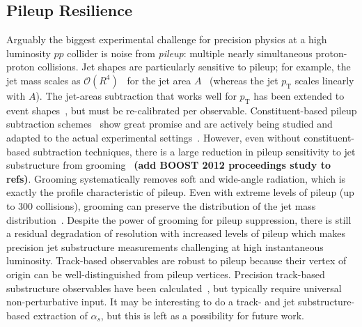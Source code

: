 \subsection{Pileup Resilience}

Arguably the biggest experimental challenge for precision physics at a high luminosity $pp$ collider is noise from \textit{pileup}: multiple nearly simultaneous proton-proton collisions.  Jet shapes are particularly sensitive to pileup; for example, the jet mass scales as $\mathcal{O}(R^4)$~\cite{Salam:2009jx} for the jet area $A$~\cite{Cacciari:2008gn} (whereas the jet $p_\text{T}$ scales linearly with $A$).  The jet-areas subtraction that works well for $p_\text{T}$ has been extended to event shapes~\cite{Soyez:2012hv}, but must be re-calibrated per observable.  Constituent-based pileup subtraction schemes~\cite{Cacciari:2014gra,Krohn:2013lba,Bertolini:2014bba,Berta:2014eza,Komiske:2017ubm} show great promise and are actively being studied and adapted to the actual experimental settings~\cite{CMS-PAS-JME-14-001,CMS-DP-2015-034,ATLAS-CONF-2017-065,ATL-PHYS-PUB-2017-020,Aad:2015ina}.  However, even without constituent-based subtraction techniques, there is a large reduction in pileup sensitivity to jet substructure from grooming~\cite{CMS-PAS-JME-14-001,Aad:2015rpa,Aad:2015ina} \textbf{(add BOOST 2012 proceedings study to refs)}.  Grooming systematically removes soft and wide-angle radiation, which is exactly the profile characteristic of pileup.   Even with extreme levels of pileup (up to 300 collisions), grooming can preserve the distribution of the jet mass distribution~\cite{JetSubstructureECFA2014}.   Despite the power of grooming for pileup suppression, there is still a residual degradation of resolution with increased levels of pileup which makes precision jet substructure measurements challenging at high instantaneous luminosity.  Track-based observables are robust to pileup because their vertex of origin can be well-distinguished from pileup vertices.  Precision track-based substructure observables have been calculated~\cite{Krohn:2012fg,Waalewijn:2012sv,Chang:2013rca,Elder:2017bkd}, but typically require universal non-perturbative input.  It may be interesting to do a track- and jet substructure-based extraction of $\alpha_s$, but this is left as a possibility for future work.
